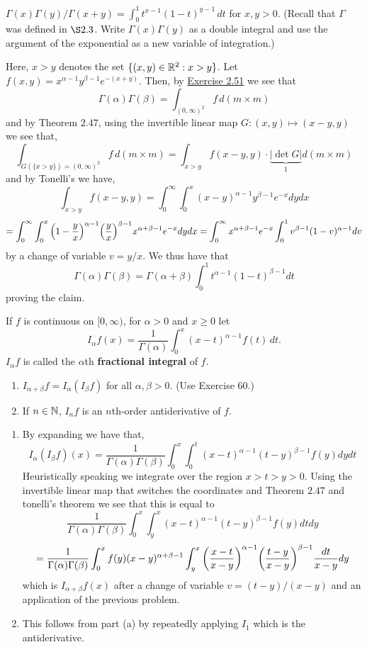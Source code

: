 \documentclass[12pt,a4paper]{article}
\begin{document}
\begin{problem}\label{prob:2-60}
$\Gamma(x)\Gamma(y)/\Gamma(x+y) = \int_0^1 t^{x-1}(1-t)^{y-1} \, dt$ for $x, y > 0$. (Recall that $\Gamma$ was defined in $\S 2.3$. Write $\Gamma(x)\Gamma(y)$ as a double integral and use the argument of the exponential as a new variable of integration.)
\end{problem}
\begin{solution}
	Here, $x>y$ denotes the set $\{(x,y)\in\mathbb{R}^2:x>y\}$. 
	Let $f(x,y)=x^{\alpha-1}y^{\beta-1}e^{-(x+y)}$. 
	Then, by \hyperref[prob:2-51]{Exercise 2.51} we see that
	\[
		\Gamma(\alpha)\Gamma(\beta)=\int_{(0,\infty)^2}f\,d(m\times m)
	\]
	and by Theorem $2.47$, using the invertible linear map $G:(x,y)\mapsto(x-y,y)$ we see that,
	\[
		\int_{G(\{x>y\})=(0,\infty)^2}f\,d(m\times m)=\int_{x>y}f(x-y,y)\cdot\underbrace{|\det G|}_{1}d(m\times m)
	\]
	and by Tonelli's we have,
	\[
		\int_{x>y}f(x-y,y)=\int_0^\infty\int_0^x(x-y)^{\alpha-1}y^{\beta-1}e^{-x}dydx
	\]
	\[
	=\int_0^\infty\int_0^x\qty(1- \frac{y}{x})^{\alpha-1}\qty( \frac{y}{x})^{\beta-1}x^{\alpha+\beta-1}e^{-x}dydx=\int_0^\infty x^{\alpha+\beta-1}e^{-x}\int_0^1v^{\beta-1}(1-v)^{\alpha-1}dv
	\]
	by a change of variable $v=y/x$. 
	We thus have that
	\[
		\Gamma(\alpha)\Gamma(\beta)=\Gamma(\alpha+\beta)\int_0^1t^{\alpha-1}(1-t)^{\beta-1}dt
	\]
	proving the claim.
\end{solution}
\begin{problem}\label{prob:2-61}
If $f$ is continuous on $[0, \infty)$, for $\alpha > 0$ and $x \ge 0$ let
\[ I_\alpha f(x) = \frac{1}{\Gamma(\alpha)} \int_0^x (x - t)^{\alpha-1} f(t) \, dt. \]
$I_\alpha f$ is called the $\alpha$th \textbf{fractional integral} of $f$.
\begin{enumerate}[label=\alph*.]
    \item $I_{\alpha+\beta} f = I_\alpha (I_\beta f)$ for all $\alpha, \beta > 0$. (Use Exercise 60.)
    \item If $n \in \mathbb{N}$, $I_n f$ is an $n$th-order antiderivative of $f$.
\end{enumerate}
\end{problem}
\begin{solution}
    \begin{enumerate}[label=\alph*.]
		\item By expanding we have that,
			\[
				I_\alpha(I_\beta f)(x)=\frac{1}{\Gamma(\alpha)\Gamma(\beta)}\int_0^x\int_0^t(x-t)^{\alpha-1}(t-y)^{\beta-1}f(y)dydt
			\]
			Heuristically speaking we integrate over the region $x>t>y>0$. 
			Using the invertible linear map that switches the coordinates and Theorem $2.47$ and tonelli's theorem we see that this is equal to
			\[
				\frac{1}{\Gamma(\alpha)\Gamma(\beta)}\int_0^x\int_y^x(x-t)^{\alpha-1}(t-y)^{\beta-1}f(y)dtdy
			\]
			\[
				= \frac{1}{\Gamma(\alpha)\Gamma(\beta)}\int_0^xf(y)(x-y)^{\alpha+\beta-1}\int_y^x\qty( \frac{x-t}{x-y})^{\alpha-1}\qty( \frac{t-y}{x-y})^{\beta-1} \frac{dt}{x-y}dy
			\]
			which is $I_{\alpha+\beta}f(x)$ after a change of variable $v=(t-y)/(x-y)$ and an application of the previous problem.
		\item This follows from part (a) by repeatedly applying $I_1$ which is the antiderivative.
    \end{enumerate}
\end{solution}
\end{document}
